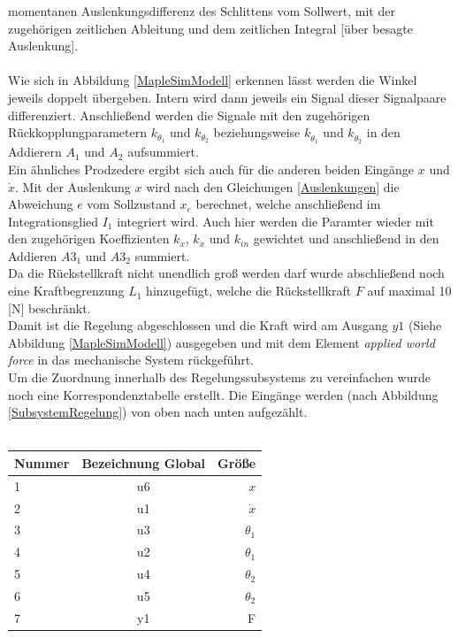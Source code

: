 \documentclass[a4paper, 10pt]{report}
\begin{document}
momentanen Auslenkungsdifferenz des Schlittens vom Sollwert, mit der zugehörigen zeitlichen Ableitung und dem zeitlichen Integral [über besagte Auslenkung]. \\ \\
Wie sich in Abbildung \ref{MapleSimModell} erkennen lässt werden die Winkel jeweils doppelt übergeben. Intern wird dann jeweils ein Signal dieser Signalpaare differenziert. Anschließend werden die Signale mit den zugehörigen Rückkopplungparametern $k_{\theta_{1}}$ und $k_{\theta_{2}}$ beziehungsweise $k_{\dot{\theta}_{1}}$ und $k_{\dot{\theta}_{2}}$ in den Addierern $A_{1}$ und $A_{2}$ aufsummiert. \\
Ein ähnliches Prodzedere ergibt sich auch für die anderen beiden Eingänge $x$ und  $\dot{x}$. Mit der Auslenkung $x$ wird nach den Gleichungen \ref{Auslenkungen} die Abweichung $e$ vom Sollzustand $x_{e}$ berechnet, welche anschließend im Integrationsglied $I_{1}$ integriert wird. Auch hier werden die Paramter wieder mit den zugehörigen Koeffizienten $k_{x}$, $k_{\dot{x}}$ und $k_{in}$ gewichtet und anschließend in den Addieren $A3_{1}$ und $A3_{2}$ summiert. \\
Da die Rückstellkraft nicht unendlich groß werden darf wurde abschließend noch eine Kraftbegrenzung $L_{1}$ hinzugefügt, welche die Rückstellkraft $F$ auf maximal 10 [N] beschränkt. \\
Damit ist die Regelung abgeschlossen und die Kraft wird am Ausgang $y1$ (Siehe Abbildung \ref{MapleSimModell}) ausgegeben und mit dem Element \textit{applied world force} in das mechanische System rückgeführt. \\
Um die Zuordnung innerhalb des Regelungssubsystems zu vereinfachen wurde noch eine Korrespondenztabelle erstellt. Die Eingänge werden (nach Abbildung \ref{SubsystemRegelung}) von oben nach unten aufgezählt. \\ \\
\center
\begin{tabular}{ l | c | r }
 	Nummer & Bezeichnung Global & Größe \\	
	\hline
  	1 & u6 & $x$ \\
  	2 & u1 & $\dot{x}$ \\
  	3 & u3 & $\theta_{1}$ \\
  	4 & u2 & $\theta_{1}$ \\
  	5 & u4 & $\theta_{2}$ \\
  	6 & u5 & $\theta_{2}$ \\
	\hline
	7 & y1 & F
\end{tabular}
\end{document}
